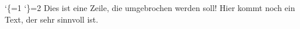 %
%
%
\catcode`\{=1 %
\catcode`\}=2 %
%
%
\hsize=2in
Dies ist eine Zeile, die umgebrochen werden soll! Hier kommt noch ein Text, der sehr sinnvoll ist.
